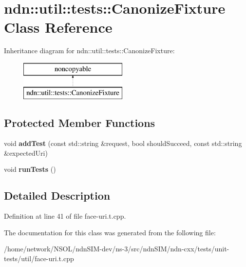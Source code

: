 \hypertarget{classndn_1_1util_1_1tests_1_1CanonizeFixture}{}\section{ndn\+:\+:util\+:\+:tests\+:\+:Canonize\+Fixture Class Reference}
\label{classndn_1_1util_1_1tests_1_1CanonizeFixture}
Inheritance diagram for ndn\+:\+:util\+:\+:tests\+:\+:Canonize\+Fixture\+:\begin{figure}[H]
\begin{center}
\leavevmode
\includegraphics[height=2.000000cm]{classndn_1_1util_1_1tests_1_1CanonizeFixture}
\end{center}
\end{figure}
\subsection*{Protected Member Functions}
\begin{DoxyCompactItemize}
\item 
void {\bfseries add\+Test} (const std\+::string \&request, bool should\+Succeed, const std\+::string \&expected\+Uri)\hypertarget{classndn_1_1util_1_1tests_1_1CanonizeFixture_a5770d061ac0cb646f174dc107771f6da}{}\label{classndn_1_1util_1_1tests_1_1CanonizeFixture_a5770d061ac0cb646f174dc107771f6da}

\item 
void {\bfseries run\+Tests} ()\hypertarget{classndn_1_1util_1_1tests_1_1CanonizeFixture_a6f5d8a791e9528b9a6f41394a1628d58}{}\label{classndn_1_1util_1_1tests_1_1CanonizeFixture_a6f5d8a791e9528b9a6f41394a1628d58}

\end{DoxyCompactItemize}


\subsection{Detailed Description}


Definition at line 41 of file face-\/uri.\+t.\+cpp.



The documentation for this class was generated from the following file\+:\begin{DoxyCompactItemize}
\item 
/home/network/\+N\+S\+O\+L/ndn\+S\+I\+M-\/dev/ns-\/3/src/ndn\+S\+I\+M/ndn-\/cxx/tests/unit-\/tests/util/face-\/uri.\+t.\+cpp\end{DoxyCompactItemize}
